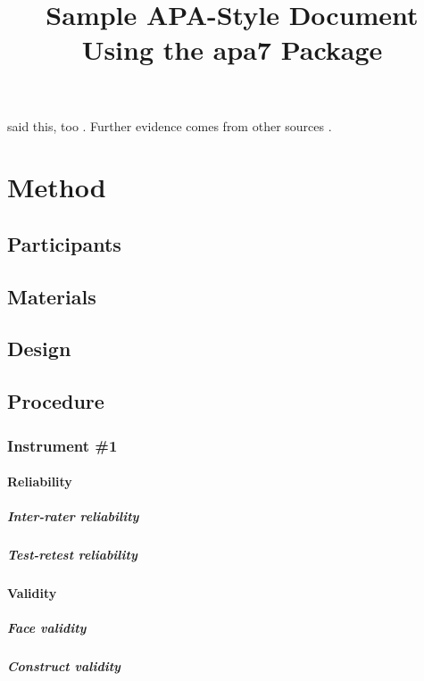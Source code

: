 \documentclass[stu]{apa7}
\title{Sample APA-Style Document Using the \textsf{apa7} Package}
\begin{document}
\maketitle
\lipsum[2]

\Textcite{vonDavier2011} said this,
too \parencite{vonDavier2011,Lassen2006}.  Further evidence comes from
other sources \parencite{Shotton1989,Lassen2006}.  \lipsum[3]

\section{Method}
\subsection{Participants}
\lipsum[4]

\subsection{Materials}
\lipsum[5]

\subsection{Design}
\lipsum[6]

\subsection{Procedure}
\lipsum[7]

\subsubsection{Instrument \#1}
\lipsum[8]

\paragraph{Reliability}
\lipsum[9]

\subparagraph{Inter-rater reliability}
\lipsum[10]

\subparagraph{Test-retest reliability}
\lipsum[11]

\paragraph{Validity}
\lipsum[12]

\subparagraph{Face validity}
\lipsum[13]

\subparagraph{Construct validity}
\lipsum[14]
\end{document}
